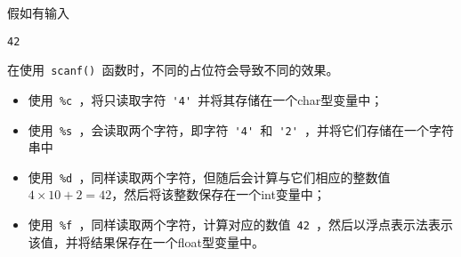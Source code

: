\begin{frame}[fragile]
假如有输入
\begin{lstlisting}
42
\end{lstlisting}
在使用\lstinline| scanf() |函数时，不同的占位符会导致不同的效果。
\end{frame}

\begin{frame}[fragile]
\begin{itemize}
\item 使用\lstinline| %c |，将只读取字符\lstinline| '4' |并将其存储在一个char型变量中；\\[0.1in]
\item 使用\lstinline| %s |，会读取两个字符，即字符\lstinline| '4' |和\lstinline| '2' |，并将它们存储在一个字符串中\\[0.1in]
\item 使用\lstinline| %d |，同样读取两个字符，但随后会计算与它们相应的整数值$4\times 10+2=42$，然后将该整数保存在一个int变量中；\\[0.1in]
\item 使用\lstinline| %f |，同样读取两个字符，计算对应的数值\lstinline| 42 |，然后以浮点表示法表示该值，并将结果保存在一个float型变量中。
\end{itemize}
\end{frame}
